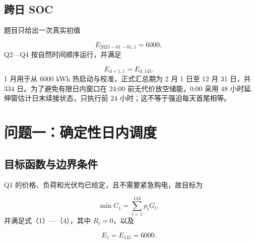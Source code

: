 \documentclass[12pt,a4paper]{ctexart}
\begin{document}
\subsection{跨日 SOC}
题目只给出一次真实初值\par
\begin{equation}
E_{\mathrm{2025-01-01},1}=6000,
\end{equation}
Q2—Q4 按自然时间顺序运行，并满足\par
\begin{equation}
E_{d+1,1}=E_{d,145}.
\tag{5}
\end{equation}
1 月用于从 6000 kWh 热启动与校准，正式汇总期为 2 月 1 日至 12 月 31 日，共 334 日。为了避免有限日内窗口在 24:00 前无代价放空储能，0:00 采用 48 小时延伸窗估计日末续接状态，只执行前 24 小时；这不等于强迫每天首尾相等。\par
\section{问题一：确定性日内调度}
\subsection{目标函数与边界条件}
Q1 的价格、负荷和光伏均已给定，且不需要紧急购电，故目标为\par
\begin{equation}
\min C_1=\sum_{t=1}^{144}p_tG_t,
\tag{6}
\end{equation}
并满足式（1）—（4），其中 $R_t=0$，以及\par
\begin{equation}
E_1=E_{145}=6000.
\tag{7}
\end{equation}
\end{document}
